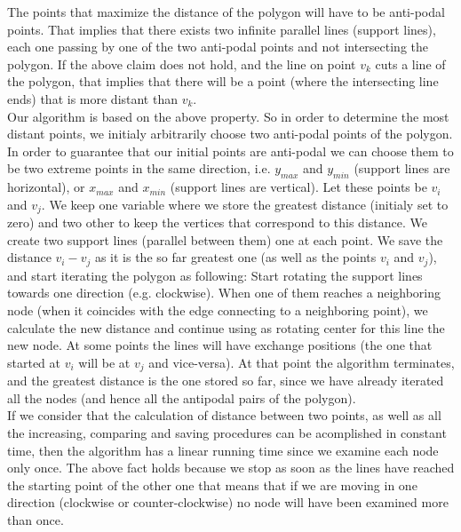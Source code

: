 The points that maximize the distance of the polygon will have to be anti-podal points. That implies that there exists two infinite parallel lines (support lines), each one passing by one of the two anti-podal points and not intersecting the polygon. If the above claim does not hold, and the line on point $v_k$ cuts a line of the polygon, that implies that there will be a point (where the intersecting line ends) that is more distant than $v_k$.\\

Our algorithm is based on the above property. So in order to determine the most distant points, we initialy arbitrarily choose two anti-podal points of the polygon. In order to guarantee that our initial points are anti-podal we can choose them to be two extreme points in the same direction, i.e. $y_{max}$ and $y_{min}$ (support lines are horizontal), or $x_{max}$ and $x_{min}$ (support lines are vertical). Let these points be $v_i$ and $v_j$. We keep one variable where we store the greatest distance (initialy set to zero) and two other to keep the vertices that correspond to this distance.  We create two support lines (parallel between them) one at each point. We save the distance $v_i-v_j$ as it is the so far greatest one (as well as the points $v_i$ and $v_j$), and start iterating the polygon as following:  Start rotating the support lines towards one direction (e.g. clockwise). When one of them reaches a neighboring node (when it coincides with the edge connecting to a neighboring point), we calculate the new distance and continue using as rotating center for this line the new node. At some points the lines will have exchange positions (the one that started at $v_i$ will be at $v_j$ and vice-versa). At that point the algorithm terminates, and the greatest distance is the one stored so far, since we have already iterated all the nodes (and hence all the antipodal pairs of the polygon).\\

If we consider that the calculation of distance between two points, as well as all the increasing, comparing and saving procedures can be acomplished in constant time, then the algorithm has a linear running time since we examine each node only once. The above fact holds because we stop as soon as the lines have reached the starting point of the other one that means that if we are moving in one direction (clockwise or counter-clockwise) no node will have been examined more than once.

